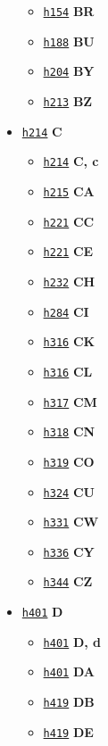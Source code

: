 \documentclass[12]{mwart}
\begin{document}
\begin{itemize}
\begin{itemize}
\begin{itemize}
       \end{itemize}
     \item \href{\pai{1}{286}}{\texttt{h154}} \textbf{BR}
     \item \href{\pai{1}{320}}{\texttt{h188}} \textbf{BU}
     \item \href{\pai{1}{336}}{\texttt{h204}} \textbf{BY}
     \item \href{\pai{1}{345}}{\texttt{h213}} \textbf{BZ}
    \end{itemize}
 \item \href{\pai{1}{346}}{\texttt{h214}} \textbf{C}
   \begin{itemize}
   \item \href{\pai{1}{346}}{\texttt{h214}} \textbf{C, c}
   \item \href{\pai{1}{347}}{\texttt{h215}} \textbf{CA}
   \item \href{\pai{1}{353}}{\texttt{h221}} \textbf{CC}
   \item \href{\pai{1}{353}}{\texttt{h221}} \textbf{CE}
   \item \href{\pai{1}{364}}{\texttt{h232}} \textbf{CH}
   \item \href{\pai{1}{416}}{\texttt{h284}} \textbf{CI}
   \item \href{\pai{1}{448}}{\texttt{h316}} \textbf{CK}
   \item \href{\pai{1}{448}}{\texttt{h316}} \textbf{CL}
   \item \href{\pai{1}{449}}{\texttt{h317}} \textbf{CM}
   \item \href{\pai{1}{450}}{\texttt{h318}} \textbf{CN}
   \item \href{\pai{1}{451}}{\texttt{h319}} \textbf{CO}
   \item \href{\pai{1}{456}}{\texttt{h324}} \textbf{CU}
   \item \href{\pai{1}{463}}{\texttt{h331}} \textbf{CW}
   \item \href{\pai{1}{468}}{\texttt{h336}} \textbf{CY}
   \item \href{\pai{1}{476}}{\texttt{h344}} \textbf{CZ}
   \end{itemize}
\item \href{\pai{1}{533}}{\texttt{h401}} \textbf{D}
  \begin{itemize}
  \item \href{\pai{1}{533}}{\texttt{h401}} \textbf{D, d}
  \item \href{\pai{1}{533}}{\texttt{h401}} \textbf{DA}
  \item \href{\pai{1}{551}}{\texttt{h419}} \textbf{DB}
  \item \href{\pai{1}{551}}{\texttt{h419}} \textbf{DE}

\end{itemize}
\end{itemize}
\end{document}
